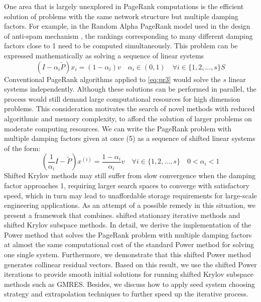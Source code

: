 \documentclass[12pt]{article}
\begin{document}
\noindent One area that is largely unexplored in PageRank computations is the efficient solution of problems with the same network structure but multiple damping factors. For example, in the Random Alpha PageRank model used in the design of anti-spam mechanism \cite{Constantine2009Random}, the rankings corresponding to many different damping factors close to 1 need to be computed simultaneously. This problem can be expressed mathematically as solving a sequence of linear systems
\begin{equation}\label{eq:pr3}
    (I - \alpha_i \tilde P)x_i = (1 - \alpha_i)v \quad  \alpha_i \in (0, 1) \quad \forall i \in \{1, 2, ..., s\} S
\end{equation}
Conventional PageRank algorithms applied to \ref{eq:pr3} would solve the $s$ linear systems independently. Although these solutions can be performed in parallel, the process would still demand large computational resources for high dimension problems.
This consideration motivates the search of novel methods with reduced algorithmic and memory complexity, to afford the solution of larger problems on moderate computing resources. We can write the PageRank problem with multiple damping factors given at once (5) as a sequence of shifted linear systems of the form:
\begin{equation}
    (\frac{1}{\alpha_i}I - \tilde P)x^{(i)} = \frac{1 - \alpha_i}{\alpha_i}v \quad \forall i \in \{1, 2, ..., s\} \quad 0 < \alpha_i < 1
\end{equation}
Shifted Krylov methods may still suffer from slow convergence when the damping factor approaches 1, requiring larger search spaces to converge with satisfactory speed, which in turn may lead to unaffordable storage requirements for large-scale engineering applications. As an attempt of a possible remedy in this situation, we present a framework that combines. shifted stationary iterative methods and shifted Krylov subspace methods. In detail, we derive the implementation of the
Power method that solves the PageRank problem with multiple damping factors at almost the same computational cost of the standard Power method for solving one single system. Furthermore, we demonstrate that this shifted Power method generates collinear residual vectors. Based on this result, we use the shifted Power iterations to provide smooth initial solutions for running shifted Krylov subspace methods such as GMRES. Besides, we discuss how to apply seed system choosing strategy and extrapolation techniques to further speed up the iterative process.
\end{document}
